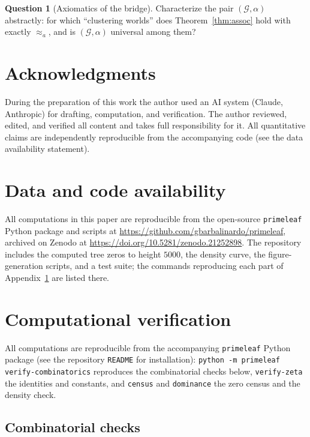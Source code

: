 \documentclass[11pt]{article}
\newcommand{\cG}{\mathcal{G}}   %
\numberwithin{equation}{section}
\theoremstyle{plain}
\theoremstyle{definition}
\newtheorem{question}[theorem]{Question}
\theoremstyle{remark}
\begin{document}
\begin{question}[Axiomatics of the bridge]\label{prob:axioms}
Characterize the pair $(\cG, \alpha)$ abstractly: for which ``clustering worlds'' does
Theorem~\ref{thm:assoc} hold with exactly $\approx_a$, and is $(\cG,\alpha)$
universal among them?
\end{question}

\section*{Acknowledgments}

During the preparation of this work the author used an AI system (Claude, Anthropic)
for drafting, computation, and verification. The author reviewed, edited, and
verified all content and takes full responsibility for it. All quantitative claims
are independently reproducible from the accompanying code (see the data availability
statement).

\section*{Data and code availability}

All computations in this paper are reproducible from the open-source
\texttt{primeleaf} Python package and scripts at
\url{https://github.com/gbarbalinardo/primeleaf}, archived on Zenodo at
\url{https://doi.org/10.5281/zenodo.21252898}. The repository includes the
computed tree zeros to height $5000$, the density curve, the figure-generation
scripts, and a test suite; the commands reproducing each part of
Appendix~\ref{app:verification} are listed there.

\appendix
\section{Computational verification}\label{app:verification}

All computations are reproducible from the accompanying \texttt{primeleaf} Python
package (see the repository \texttt{README} for installation):
\texttt{python -m primeleaf verify-combinatorics} reproduces the combinatorial
checks below, \texttt{verify-zeta} the identities and constants, and
\texttt{census} and \texttt{dominance} the zero census and the density check.

\subsection{Combinatorial checks}
\end{document}
